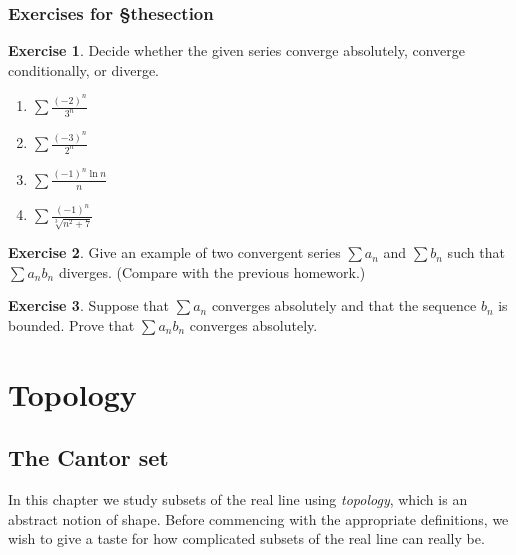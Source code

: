 \documentclass[11pt,oneside]{amsbook}
\theoremstyle{definition}
\newtheorem{exerc}{Exercise}[section]
\theoremstyle{plain}
\theoremstyle{definition}
\theoremstyle{remark}
\numberwithin{equation}{section}
\numberwithin{figure}{section}
\begin{document}
\newpage
\subsection*{Exercises for \S thesection}

\begin{exerc}
  Decide whether the given series converge absolutely, converge conditionally, or diverge.
  \begin{enumerate}
  \item $\displaystyle\sum\frac{(-2)^n}{3^n}$
  \item $\displaystyle\sum\frac{(-3)^n}{2^n}$
  \item $\displaystyle\sum\frac{(-1)^n\ln n}{n}$
  \item $\displaystyle\sum\frac{(-1)^n}{\sqrt[3]{n^2+7}}$
  \end{enumerate}
\end{exerc}

\begin{exerc}
  Give an example of two convergent series $\sum a_n$ and $\sum b_n$ such that $\sum a_nb_n$ diverges. (Compare with the previous homework.)
\end{exerc}

\begin{exerc}
  Suppose that $\sum a_n$ converges absolutely and that the sequence $b_n$ is bounded.  Prove that $\sum a_nb_n$ converges absolutely.
\end{exerc}


\chapter{Topology}

\section{The Cantor set}

In this chapter we study subsets of the real line using \emph{topology}, which is an abstract notion of shape. Before commencing with the appropriate definitions, we wish to give a taste for how complicated subsets of the real line can really be.
\end{document}
